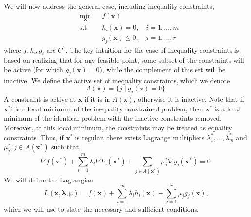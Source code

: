 We will now address the general case, including inequality constraints,
\begin{equation*}
\begin{aligned}
& \underset{\bm{x}}{\min}
& & f(\bm{x})\\
& \textrm{s.t.} & & h_i(\bm{x}) = 0, \quad i = 1, \ldots, m\\
& & & g_j(\bm{x}) \leq 0, \quad j = 1, \ldots, r
\end{aligned}
\end{equation*}
where $f,h_i,g_i$ are $C^1$. The key intuition for the case of  inequality constraints is based on realizing that for any feasible point, some subset of the constraints will be active (for which $g_j(\bm{x}) = 0$), while the complement of this set will be inactive. We define the active set of inequality constraints, which we denote 
\begin{equation}
    A(\bm{x}) = \{j \mid g_j(\bm{x}) = 0\}.
\end{equation}
A constraint is active at $\bm{x}$ if it is in $A(\bm{x})$, otherwise it is inactive. Note that if $\bm{x}^*$i is a local minimum of the inequality constrained problem, then $\bm{x}^*$ is a local minimum of the identical problem with the inactive constraints removed. Moreover, at this local minimum, the constraints may be treated as equality constraints. Thus, if $\bm{x}^*$ is regular, there exists Lagrange multipliers $\lambda_1^*, \ldots, \lambda_m^*$ and $\mu_j^*, j \in A(\bm{x}^*)$ such that 
\begin{equation}
\nabla f(\bm{x}^*) + \sum^m_{i=1} \lambda_i \nabla h_i(\bm{x}^*) + \sum_{j \in A(\bm{x}^*)} \mu_j^* \nabla g_j(\bm{x}^*)= 0.    
\end{equation}
We will define the Lagrangian
\begin{equation}
    L(\bm{x},\bm{\lambda}, \bm{\mu}) = f(\bm{x}) + \sum^m_{i=1} \lambda_i h_i(\bm{x}) + \sum_{j =1}^r \mu_j  g_j(\bm{x}),
\end{equation}
which we will use to state the necessary and sufficient conditions. 

